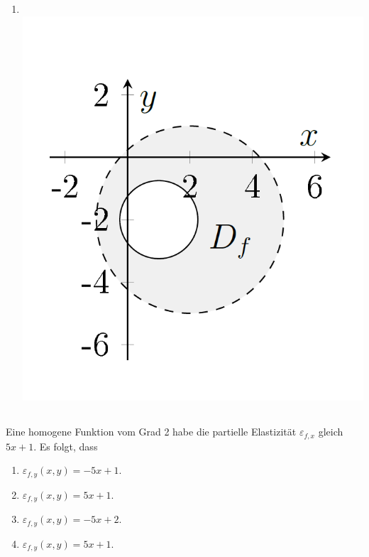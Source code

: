 \begin{enumerate}
\item \text{} \\
\includegraphics[scale=0.3]{pictures/BildD}
\end{enumerate}

\subsection*{}
Eine homogene Funktion vom Grad 2 habe die partielle Elastizität 
$\varepsilon_{f,x}$ gleich $5x+1$.
Es folgt, dass
\renewcommand{\labelenumi}{(\alph{enumi})}
\begin{enumerate}
\item $\varepsilon_{f,y}(x,y) = -5x +1$.
\item $\varepsilon_{f,y}(x,y) = 5x +1$.
\item $\varepsilon_{f,y}(x,y) = -5x +2$.
\item $\varepsilon_{f,y}(x,y) = 5x +1$.
\end{enumerate}
 \ \\
\\
